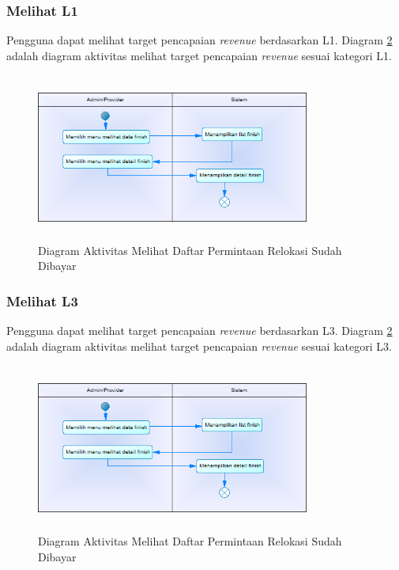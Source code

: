 \subsubsection{Melihat L1}
Pengguna dapat melihat target pencapaian \textit{revenue} berdasarkan L1. Diagram \ref{figure:activity_melihat_finish} adalah diagram aktivitas melihat target pencapaian \textit{revenue} sesuai kategori L1.

	\begin{figure}[h]
	\centerline {\includegraphics[width=9cm,height=5.5cm]{bab4/ActivityDiagram_MelihatFinish.png}}
	\caption{Diagram Aktivitas Melihat Daftar Permintaan Relokasi Sudah Dibayar}
	\label{figure:activity_melihat_finish}
	\end{figure}

\subsubsection{Melihat L3}
Pengguna dapat melihat target pencapaian \textit{revenue} berdasarkan L3. Diagram \ref{figure:activity_melihat_finish} adalah diagram aktivitas melihat target pencapaian \textit{revenue} sesuai kategori L3.

\begin{figure}[h]
	\centerline {\includegraphics[width=9cm,height=5.5cm]{bab4/ActivityDiagram_MelihatFinish.png}}
	\caption{Diagram Aktivitas Melihat Daftar Permintaan Relokasi Sudah Dibayar}
	\label{figure:activity_melihat_finish}
\end{figure}


